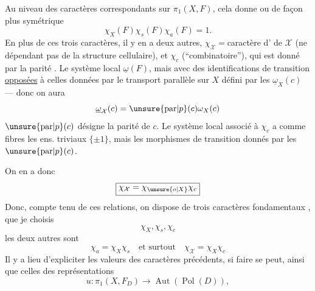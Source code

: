 Au niveau des caractères correspondants sur $\pi_1(X,F)$, cela donne
ou de façon plus symétrique
\[\chi_X(F)\chi_s(F)\chi_a(F)=1.\]
En plus de ces trois caractères, il y en a deux autres, $\chi_{\mathcal X}={}$caractère d' de $\mathcal X$ (ne dépendant pas de la structure cellulaire), et $\chi_c$ (``combinatoire''), qui est donné par la parité . Le système local   $\underline\omega(F)$, mais avec des identifications de transition \uline{opposées} à celles données par  le transport parallèle sur $X$
défini par les $\underline\omega_X(c)$ --- donc on aura
\[\underline\omega_{\mathcal X}(c)=\unsure{\mathrm{par}|p}(c)\omega_X(c)\]
 $\unsure{\mathrm{par}|p}(c)$ désigne la parité de $c$.
 Le système local associé à $\chi_c$ a  comme fibres les ens. triviaux $\{\pm1\}$, mais les morphismes de transition donnés par les $\unsure{\mathrm{par}|p}(c)$.

On en a donc
\[\boxed{\chi_{\mathcal X}=\chi_{\unsure{o|X}}\chi_c}\]
Donc, compte tenu de ces relations, on dispose de trois caractères fondamentaux , que je choisis
\[\chi_X,\chi_s,\chi_c\]
 les deux autres sont
\[\chi_a=\chi_X\chi_s\quad\text{et surtout}\quad\chi_{\mathcal X}=\chi_X\chi_c\]
Il y a lieu d'expliciter les valeurs des caractères précédents, si faire se peut, ainsi que celles des représentations
\[u:\pi_1(X,F_D)\longrightarrow\operatorname{Aut}(\operatorname{Pol}(D)),\]
